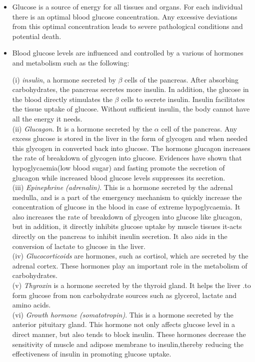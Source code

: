 \begin{itemize}
	
	\item  Glucose is a source of energy for all tissues and organs. For each individual there is an optimal blood glucose concentration. Any excessive deviations from this optimal concentration leads to severe pathological conditions and potential death.
	\item  Blood glucose levels are influenced and controlled by a various of hormones and metabolism such as the following: 
	
	(i) \textit{insulin}, a hormone secreted by $ \beta $ cells of the pancreas. After absorbing carbohydrates, the pancreas secretes more insulin. In addition, the glucose in the blood directly stimulates the $ \beta $ cells to secrete insulin. Insulin facilitates the tissue uptake of glucose. Without sufficient insulin, the body cannot have all the energy it needs.\\
	
	(ii) \textit{Glucagon}. It is a hormone secreted by the $ \alpha $ cell of the pancreas. Any excess glucose is stored in the liver in the form of glycogen and when needed this glycogen in converted back into glucose. The hormone glucagon increases the rate of breakdown of glycogen into glucose. Evidences have shown that hypoglycaemia(low blood sugar) and fasting promote the secretion of glucagon while increased blood glucose levels suppresses its secretion.\\
	
	(iii) \textit{Epinephrine (adrenalin)}. This is a hormone secreted by the adrenal medulla, and is a part of the emergency mechanism to quickly increase the concentration of glucose in the blood in case of extreme hypoglycaemia. It also increases the rate of breakdown of glycogen into glucose like glucagon, but in addition, it directly inhibits glucose uptake by muscle tissues it-acts directly on the pancreas to inhibit insulin secretion. It also aids in the conversion of lactate to glucose in the liver.\\
	
	(iv) \textit{Glucocorticoids} are hormones, such as cortisol, which are secreted by the adrenal cortex. These hormones play an important role in the metabolism of carbohydrates.\\
	
	(v) \textit{Thyroxin} is a hormone secreted by the thyroid gland. It helps the liver .to form glucose from non carbohydrate sources such as glycerol, lactate and amino acids.\\
	
	(vi) \textit{Growth hormone (somatotropin)}. This is a hormone secreted by the anterior pituitary gland. This hormone not only affects glucose level in a direct manner, but also tends to block insulin. These hormones decrease the sensitivity of muscle and adipose membrane to insulin,thereby reducing the effectiveness of insulin in promoting glucose uptake.	
\end{itemize}

